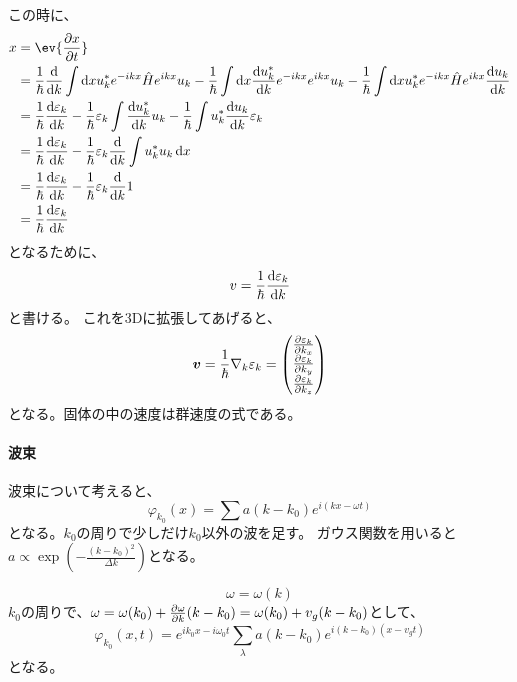 \documentclass[titlepage]{ltjsarticle}
\begin{document}
この時に、
\begin{align}
  x & = \ev{\pdv{x}{t}} \\
  & = \frac{1}{\hbar} \odv{}{k} \int \odif{x} u_k^* e^{-ikx} \hat{H} e^{ikx} u_k  - \frac{1}{\hbar} \int \odif{x} \odv{u_k^*}{k} e^{-ikx} e^{ikx}u_k - \frac{1}{\hbar} \int \odif{x} u^*_k e^{-ikx} \hat{H} e^{ikx} \odv{u_k}{k} \\
  & = \frac{1}{\hbar} \odv{\varepsilon_k}{k} - \frac{1}{\hbar} \varepsilon_k \int \odv{u_k^*}{k} u_k - \frac{1}{\hbar} \int u_k^* \odv{u_k}{k} \varepsilon_k\\
  & = \frac{1}{\hbar} \odv{\varepsilon_k}{k} - \frac{1}{\hbar}\varepsilon_k \odv{}{k} \int u^*_k u_k \odif{x} \\
  & = \frac{1}{\hbar} \odv{\varepsilon_k}{k}  - \frac{1}{\hbar}\varepsilon_k \odv{}{k} 1\\
  & = \frac{1}{\hbar} \odv{\varepsilon_k}{k}
\end{align}
となるために、
\begin{equation}
  v = \frac{1}{\hbar} \odv{\varepsilon_k}{k}
\end{equation}
と書ける。
これを3Dに拡張してあげると、
\begin{equation}
  \bm{v} = \frac{1}{\hbar} \nabla_k \varepsilon_k 
  = 
  \begin{pmatrix}
    \pdv{\varepsilon_k}{k_x} \\
    \pdv{\varepsilon_k}{k_y} \\
    \pdv{\varepsilon_k}{k_z}
  \end{pmatrix}
\end{equation}
となる。固体の中の速度は群速度の式である。

\paragraph{波束}
波束について考えると、
\begin{equation}
  \varphi_{k_0}(x) = \sum a (k-k_0) e^{i(kx-\omega t)}
\end{equation}
となる。\(k_0\)の周りで少しだけ\(k_0\)以外の波を足す。
ガウス関数を用いると\(a \propto \exp\left( - \frac{(k-k_0)^2}{\Delta k} \right)\)となる。

\begin{equation}
  \omega = \omega(k)
\end{equation}
\(k_0\)の周りで、\(\omega=\omega(k_0) + \pdv{\omega}{k}(k-k_0)=\omega(k_0) + v_g(k-k_0)\)として、
\begin{equation}
  \varphi_{k_0}(x,t) = e^{ik_0x - i \omega_0t}\sum_\lambda a(k-k_0) e^{i(k-k_0)(x-v_gt)}
\end{equation}
となる。
\end{document}
